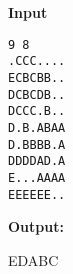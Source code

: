 \textbf{Input}
\begin{verbatim}
9 8
.CCC....
ECBCBB..
DCBCDB..
DCCC.B..
D.B.ABAA
D.BBBB.A
DDDDAD.A
E...AAAA
EEEEEE..
\end{verbatim}




\textbf{Output:}





EDABC